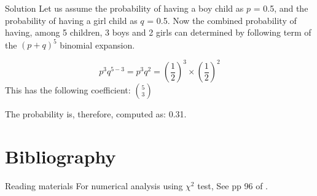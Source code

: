 \documentclass[11pt,ignorenonframetext,aspectratio=169]{beamer}
\newif\ifbibliography
\begin{document}
\begin{frame}{Solution}
\protect\hypertarget{solution-2}{}
Let us assume the probability of having a boy child as \(p\) = 0.5, and
the probability of having a girl child as \(q\) = 0.5. Now the combined
probability of having, among 5 children, 3 boys and 2 girls can
determined by following term of the \((p + q)^5\) binomial expansion.

\[
p^3q^{5-3} = p^3q^{2} = \left(\frac{1}{2}\right)^3 \times \left(\frac{1}{2}\right)^2
\] This has the following coefficient: \(5\choose{3}\)

The probability is, therefore, computed as: 0.31.
\end{frame}

\hypertarget{bibliography}{%
\section{Bibliography}\label{bibliography}}

\begin{frame}{Reading materials}
\protect\hypertarget{reading-materials}{}
For numerical analysis using \(\chi^2\) test, See pp 96 of
\textcite{griffiths2015introduction}.
\end{frame}


  \begin{frame}[allowframebreaks]{}
  \bibliographytrue
  \printbibliography[heading=none]
  \end{frame}
\end{document}
